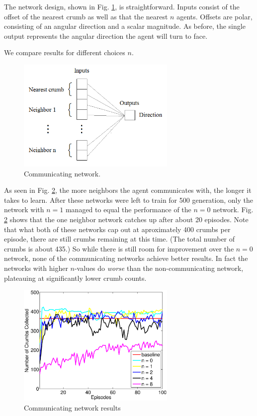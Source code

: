 \documentclass[conference]{IEEEtran}
\begin{document}
The network design, shown in Fig. \ref{neroevolution:communication}, is straightforward. Inputs consist of the offset of the nearest crumb as well as that the nearest $n$ agents. Offsets are polar, consisting of an angular direction and a scalar magnitude. As before, the single output represents the angular direction the agent will turn to face. 

We compare results for different choices $n$. 

\begin{figure}[t]
\centering
\includegraphics[width=3.0in]{./figures/neroevolution/comm_network.png}
\caption{Communicating network.}
\label{neroevolution:communication}
\end{figure}

As seen in Fig. \ref{neroevolution:communication_results}, the more neighbors the agent communicates with, the longer it takes to learn. After these networks were left to train for 500 generation, only the network with $n=1$ managed to equal the performance of the $n=0$ network. Fig. \ref{neroevolution:communication_results} shows that the one neighbor network catches up after about 20 episodes. Note that what both of these networks cap out at aproximately 400 crumbs per episode, there are still crumbs remaining at this time. (The total number of crumbs is about 435.) So while there is still room for improvement over the $n=0$ network, none of the communicating networks achieve better results. In fact the networks with higher $n$-values do \textit{worse} than the non-communicating network, plateauing at significantly lower crumb counts.

\begin{figure}[t]
\centering
\includegraphics[width=3.0in]{./figures/neroevolution/comm_result.eps}
\caption{Communicating network results}
\label{neroevolution:communication_results}
\end{figure}
\end{document}
